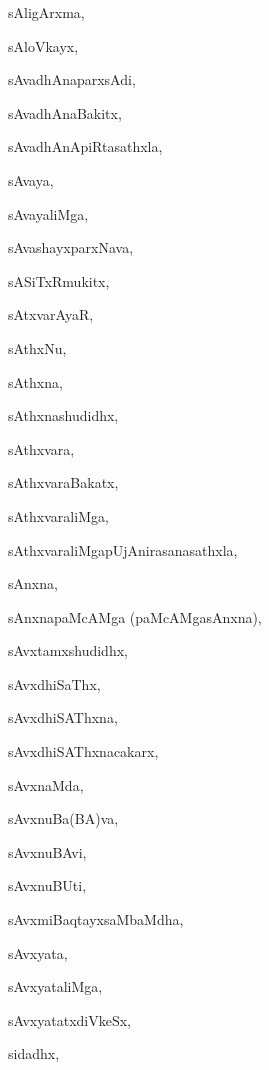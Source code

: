 \begin{multicols}{2}
{sAligArxma}, \pageref{sAligArxma}

{sAloVkayx}, \pageref{sAloVkayx}

{sAvadhAnaparxsAdi}, \pageref{sAvadhAnaparxsAdi}

{sAvadhAnaBakitx}, \pageref{sAvadhAnaBakitx}

{sAvadhAnApiRtasathxla}, \pageref{sAvadhAnApiRtasathxla}

{sAvaya}, \pageref{sAvaya}

{sAvayaliMga}, \pageref{sAvayaliMga}

{sAvashayxparxNava}, \pageref{sAvashayxparxNava}

{sASiTxRmukitx}, \pageref{sASiTxRmukitx}

{sAtxvarAyaR}, \pageref{sAtxvarAyaR}

{sAthxNu}, \pageref{sAthxNu}

{sAthxna}, \pageref{sAthxna}

{sAthxnashudidhx}, \pageref{sAthxnashudidhx}

{sAthxvara}, \pageref{sAthxvara}

{sAthxvaraBakatx}, \pageref{sAthxvaraBakatx}

{sAthxvaraliMga}, \pageref{sAthxvaraliMga}

{sAthxvaraliMgapUjAnirasanasathxla}, \pageref{sAthxvaraliMgapUjAnirasanasathxla}

{sAnxna}, \pageref{sAnxna}

{sAnxnapaMcAMga (paMcAMgasAnxna)}, \pageref{sAnxnapaMcAMgapaMcAMgasAnxna}

{sAvxtamxshudidhx}, \pageref{sAvxtamxshudidhx}

{sAvxdhiSaThx}, \pageref{sAvxdhiSaThx}

{sAvxdhiSAThxna}, \pageref{sAvxdhiSAThxna}

{sAvxdhiSAThxnacakarx}, \pageref{sAvxdhiSAThxnacakarx}

{sAvxnaMda}, \pageref{sAvxnaMda}

{sAvxnuBa(BA)va}, \pageref{sAvxnuBaBAva}

{sAvxnuBAvi}, \pageref{sAvxnuBAvi}

{sAvxnuBUti}, \pageref{sAvxnuBUti}

{sAvxmiBaqtayxsaMbaMdha}, \pageref{sAvxmiBaqtayxsaMbaMdha}

{sAvxyata}, \pageref{sAvxyata}

{sAvxyataliMga}, \pageref{sAvxyataliMga}

{sAvxyatatxdiVkeSx}, \pageref{sAvxyatatxdiVkeSx}

{sidadhx}, \pageref{sidadhx}


\end{multicols}
